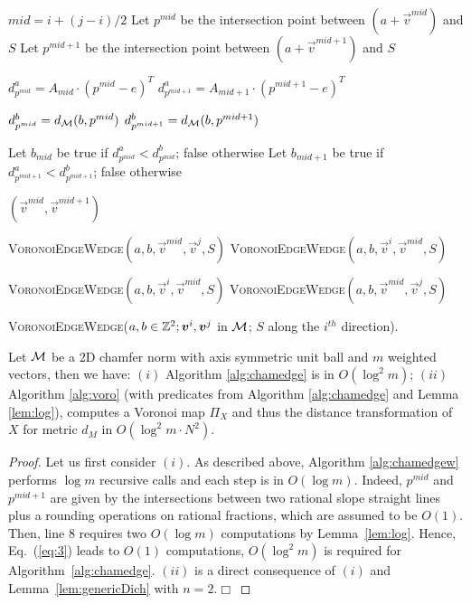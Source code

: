\documentclass{llncs}
\begin{document}
\begin{algorithm}[t]
\footnotesize
{
   $mid  = i + (j-i)/2$\;
   Let $p^{mid}$  be the intersection point between $(a +
   \vec{v}^{mid})$ and $S$\;
  Let $p^{mid+1}$  be the intersection point between $(a +
   \vec{v}^{mid+1})$ and $S$\;


   $d^a_{p^{mid}} = A_{mid}\cdot (p^{mid}-e)^T$\;
   $d^a_{p^{mid+1}} = A_{mid+1}\cdot (p^{mid+1}-e)^T$\;


   $d^b_{p^{mid}} = d_{\mathcal{M}}(b, p^{mid})$\;
   $d^b_{p^{mid+1}} = d_{\mathcal{M}}(b,p^{mid+1})$\;

   Let $b_{mid}$ be true if $d^a_{p^{mid}} < d^b_{p^{mid}}$; false otherwise\;
   Let $b_{mid+1}$ be true if $d^a_{p^{mid+1}} < d^b_{p^{mid+1}}$; false otherwise\;


    { \Return $(\vec{v}^{mid},\vec{v}^{mid+1})$\; }

{
{
  \Return \textsc{VoronoiEdgeWedge}$(a,b,\vec{v}^{mid}, \vec{v}^{j}, S)$\;
}
{
  \Return \textsc{VoronoiEdgeWedge}$(a,b,\vec{v}^{i}, \vec{v}^{mid}, S)$\;
}

}
{
{
  \Return \textsc{VoronoiEdgeWedge}$(a,b,\vec{v}^{i}, \vec{v}^{mid}, S)$\;
}
{
  \Return \textsc{VoronoiEdgeWedge}$(a,b,\vec{v}^{mid}, \vec{v}^{j}, S)$\;
}

}

}
  \caption{\footnotesize
\textsc{VoronoiEdgeWedge}($a,b\in\Z^2; \vec{v}^i,\vec{v}^j$
    in $\mathcal{M}$; $S$ along the $i^{th}$ direction).\label{alg:chamedgew}}
\end{algorithm}
\begin{theorem}
\label{them}
  Let $\mathcal{M}$ be a 2D chamfer norm with axis symmetric unit ball and  $m$ weighted vectors, then we
  have:
  $(i)$ Algorithm     \ref{alg:chamedge} is in  $O(\log^2{m})$;
  $(ii)$ Algorithm \ref{alg:voro} (with predicates from Algorithm
    \ref{alg:chamedge} and Lemma \ref{lem:log}), computes a Voronoi
    map $\Pi_X$ and thus the distance transformation of $X$ for metric
    $d_{M}$ in   $ O( \log^2{m}\cdot N^2)$.
\end{theorem}
\begin{proof}
Let us first consider  $(i)$. As described above, Algorithm
\ref{alg:chamedgew} performs $\log{m}$ recursive calls and each step
is in $O(\log{m})$. Indeed, $p^{mid}$ and $p^{mid+1}$ are given by the
intersections between two rational slope straight lines plus a
rounding operations on rational fractions, which are assumed to be $O(1)$. Then,
line 8 requires two $O(\log{m})$ computations by
Lemma~\ref{lem:log}. Hence, Eq.~(\ref{eq:3}) leads to $O(1)$
computations, $O(\log^2{m})$ is required for
Algorithm~\ref{alg:chamedge}.   $(ii)$ is a direct
consequence of  $(i)$ and Lemma~\ref{lem:genericDich} with
$n=2$.$\Box$
\end{proof}
\end{document}
